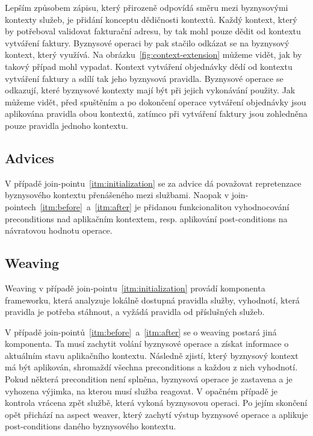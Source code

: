 Lepším způsobem zápisu, který přirozeně odpovídá směru mezi byznysovými kontexty služeb,
je přidání konceptu dědičnosti kontextů. Každý kontext, který by potřeboval validovat fakturační
adresu, by tak mohl pouze dědit od kontextu vytváření faktury. Byznysové operaci by pak stačilo
odkázat se na byznysový kontext, který využívá. Na obrázku~\ref{fig:context-extension} můžeme vidět,
jak by takový případ mohl vypadat. Kontext vytváření objednávky dědí od kontextu vytváření faktury
a sdílí tak jeho byznysová pravidla. Byznysové operace se odkazují, které byznysové kontexty mají
být při jejich vykonávání použity. Jak můžeme vidět, před spuštěním a po dokončení operace vytváření
objednávky jsou aplikována pravidla obou kontextů, zatímco při vytváření faktury jsou zohledněna
pouze pravidla jednoho kontextu.

\subsection{Advices}

V případě join-pointu~\ref{itm:initialization} se za advice dá považovat repretenzace byznysového
kontextu přenášeného mezi službami. Naopak v join-pointech~\ref{itm:before}~a~\ref{itm:after}
je přidanou funkcionalitou vyhodnocování preconditions nad aplikačním kontextem, resp. aplikování
post-conditions na návratovou hodnotu operace.

\subsection{Weaving}

Weaving v případě join-pointu~\ref{itm:initialization} provádí komponenta frameworku, která
analyzuje lokálně dostupná pravidla služby, vyhodnotí, která pravidla je potřeba stáhnout,
a vyžádá pravidla od příslušných služeb.

V případě join-pointů~\ref{itm:before}~a~\ref{itm:after} se o weaving postará jiná komponenta.
Ta musí zachytit volání byznysové operace a získat informace o aktuálním stavu aplikačního kontextu.
Následně zjistí, který byznysový kontext má být aplikován, shromaždí všechna preconditions
a každou z nich vyhodnotí. Pokud některá precondition není splněna, byznysová operace je zastavena
a je vyhozena výjimka, na kterou musí služba reagovat. V opačném případě je kontrola vrácena zpět
službě, která vykoná byznysovou operaci. Po jejím skončení opět přichází na aspect weaver, který
zachytí výstup byznysové operace a aplikuje post-conditions daného byznysového kontextu.

